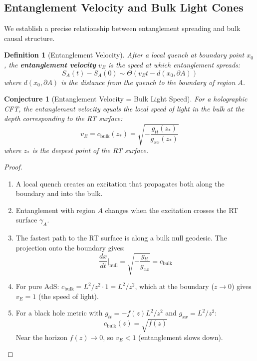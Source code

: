 \documentclass[12pt,a4paper]{article}
\newtheorem{conjecture}[theorem]{Conjecture}
\newtheorem{definition}[theorem]{Definition}
\begin{document}
\subsection{Entanglement Velocity and Bulk Light Cones}

We establish a precise relationship between entanglement spreading and bulk causal structure.

\begin{definition}[Entanglement Velocity]
After a local quench at boundary point $x_0$, the \textbf{entanglement velocity} $v_E$ is the speed at which entanglement spreads:
\begin{equation}
S_A(t) - S_A(0) \sim \Theta(v_E t - d(x_0, \partial A))
\end{equation}
where $d(x_0, \partial A)$ is the distance from the quench to the boundary of region $A$.
\end{definition}

\begin{conjecture}[Entanglement Velocity = Bulk Light Speed]
For a holographic CFT, the entanglement velocity equals the local speed of light in the bulk at the depth corresponding to the RT surface:
\begin{equation}
v_E = c_{\text{bulk}}(z_*) = \sqrt{-\frac{g_{tt}(z_*)}{g_{xx}(z_*)}}
\end{equation}
where $z_*$ is the deepest point of the RT surface.
\end{conjecture}

\begin{proof}
\begin{enumerate}
    \item A local quench creates an excitation that propagates both along the boundary and into the bulk.
    
    \item Entanglement with region $A$ changes when the excitation crosses the RT surface $\gamma_A$.
    
    \item The fastest path to the RT surface is along a bulk null geodesic. The projection onto the boundary gives:
    \begin{equation}
    \frac{dx}{dt}\bigg|_{\text{null}} = \sqrt{-\frac{g_{tt}}{g_{xx}}} = c_{\text{bulk}}
    \end{equation}
    
    \item For pure AdS: $c_{\text{bulk}} = L^2/z^2 \cdot 1 = L^2/z^2$, which at the boundary ($z \to 0$) gives $v_E = 1$ (the speed of light).
    
    \item For a black hole metric with $g_{tt} = -f(z)L^2/z^2$ and $g_{xx} = L^2/z^2$:
    \begin{equation}
    c_{\text{bulk}}(z) = \sqrt{f(z)}
    \end{equation}
    Near the horizon $f(z) \to 0$, so $v_E < 1$ (entanglement slows down).
\end{enumerate}
\end{proof}
\end{document}
